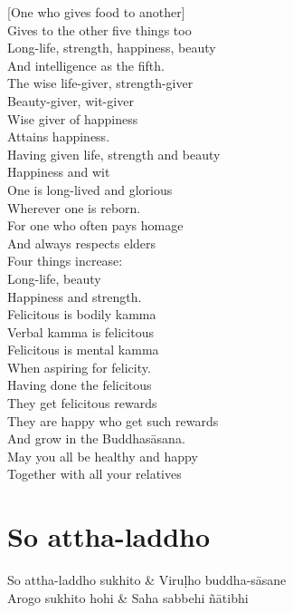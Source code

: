 \begin{english}
  [One who gives food to another]\\
  Gives to the other five things too\\
  Long-life, strength, happiness, beauty\\
  And intelligence as the fifth.\\
  The wise life-giver, strength-giver\\
  Beauty-giver, wit-giver\\
  Wise giver of happiness\\
  Attains happiness.\\
  Having given life, strength and beauty\\
  Happiness and wit\\
  One is long-lived and glorious\\
  Wherever one is reborn.\\
  For one who often pays homage\\
  And always respects elders\\
  Four things increase:\\
  Long-life, beauty\\
  Happiness and strength.\\
  Felicitous is bodily kamma\\
  Verbal kamma is felicitous\\
  Felicitous is mental kamma\\
  When aspiring for felicity.\\
  Having done the felicitous\\
  They get felicitous rewards\\
  They are happy who get such rewards\\
  And grow in the Buddhasāsana.\\
  May you all be healthy and happy\\
  Together with all your relatives
\end{english}


\section{So attha-laddho}

\begin{twochants}
  So attha-laddho sukhito & Viruḷho buddha-sāsane\\
  Arogo sukhito hohi & Saha sabbehi ñātibhi
\end{twochants}

